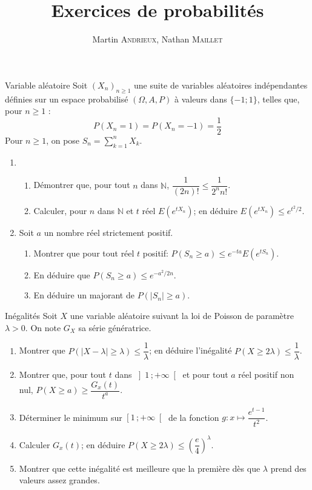 \documentclass[french, a4paper, 11pt]{article}
\title{Exercices de probabilités}
\author{Martin \textsc{Andrieux}, Nathan \textsc{Maillet}}
\date{}
\newcommand{\N}{\mathbb{N}}   %
\newcommand{\po}{\left(}         %
\newcommand{\pf}{\right)}        %
\newcommand{\pof}[1]{\po #1 \pf} %
\newcommand{\interoo}[2]{\left]#1\,;#2\right[}   %
\newcommand{\interfo}[2]{\left[#1\,;#2\right[}   %
\begin{document}
\maketitle

\begin{cadre}{Variable aléatoire}
  Soit \(\pof{X_{n}}_{n\geqslant 1}\) une suite de variables aléatoires indépendantes définies sur un espace probabilisé \(\pof{\Omega, A, P}\) à valeurs dans \(\lbrace -1;1\rbrace\), telles que, pour \(n\geqslant 1\) :
  \[P\pof{X_{n} = 1} = P\pof{X_{n} = -1} = \dfrac{1}{2}\]
  Pour \(n\geqslant 1\), on pose \(S_{n} = \sum_{k=1}^{n} X_{k}\).
  \begin{enumerate}
      \item
      \begin{enumerate}
        \item Démontrer que, pour tout \(n\) dans \(\N\), \(\dfrac{1}{(2n)!}\leqslant\dfrac{1}{2^{n}n!}\).
        \item Calculer, pour \(n\) dans \(\N\) et \(t\) réel \(E\pof{e^{tX_{n}}}\); en déduire \(E(e^{tX_{n}}) \leqslant e^{t^{2}/2}\).
      \end{enumerate}
    \item Soit \(a\) un nombre réel strictement positif.
      \begin{enumerate}
        \item Montrer que pour tout réel \(t\) positif: \(P(S_{n}\geqslant a) \leqslant e^{-ta}E(e^{tS_{n}})\).
        \item En déduire que \(P(S_{n}\geqslant a)\leqslant e^{-a^{2}/2n}\).
        \item En déduire un majorant de \(P(\lvert S_{n}\rvert \geqslant a)\).
      \end{enumerate}
  \end{enumerate}
\end{cadre}

\begin{cadre}{Inégalités}
  Soit $X$ une variable aléatoire suivant la loi de Poisson de paramètre $\lambda >0$. On note $G_{X}$ sa série génératrice.
  \begin{enumerate}
    \item Montrer que $P\pof{\lvert X-\lambda\rvert \geqslant \lambda}\leqslant \dfrac{1}{\lambda}$; en déduire l'inégalité $P(X\geqslant 2\lambda) \leqslant \dfrac{1}{\lambda}$.
    \item Montrer que, pour tout $t$ dans $\interoo{1}{+\infty}$ et pour tout $a$ réel positif non nul, $P(X\geqslant a)\geqslant \dfrac{G_{x}(t)}{t^{a}}$.
    \item Déterminer le minimum sur $\interfo{1}{+\infty}$ de la fonction $g:x\mapsto\dfrac{e^{t-1}}{t^{2}}$.
    \item Calculer $G_{x}(t)$; en déduire $P(X\geqslant 2\lambda)\leqslant\pof{\dfrac{e}{4}}^{\lambda}$.
    \item Montrer que cette inégalité est meilleure que la première dès que $\lambda$ prend des valeurs assez grandes.
  \end{enumerate}
\end{cadre}
\end{document}
